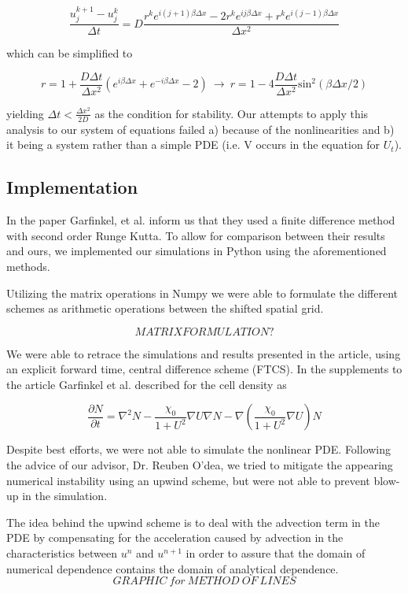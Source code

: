 \documentclass{article}
\begin{document}
$$\frac{u_j^{k+1}-u_j^k}{\Delta t} = D\frac{r^ke^{i(j+1)\beta \Delta x}-2r^ke^{ij\beta \Delta x}+r^ke^{i(j-1)\beta \Delta x}}{\Delta x^2}$$

\medskip
which can be simplified to
\smallskip

$$r=1+\frac{D \Delta t}{\Delta x^2}(e^{i\beta \Delta x}+e^{-i\beta \Delta x}-2)\ \to\ r=1-4\frac{D \Delta t}{\Delta x^2} \mathrm{sin}^2(\beta\Delta x/2)$$
\smallskip

yielding $\Delta t < \frac{\Delta x^2}{2D}$ as the condition for stability. Our attempts to apply this analysis to our system of equations failed a) because of the nonlinearities and b) it being a system rather than a simple PDE (i.e. V occurs in the equation for $U_t$).

\subsection{Implementation}

In the paper Garfinkel, et al. inform us that they used a finite difference method with second order Runge Kutta. To allow for comparison between their results and ours, we implemented our simulations in Python using the aforementioned methods.

Utilizing the matrix operations in Numpy we were able to formulate the different schemes as arithmetic operations between the shifted spatial grid.

$$MATRIX FORMULATION?$$

We were able to retrace the simulations and results presented in the article, using an explicit forward time, central difference scheme (FTCS). In the supplements to the article Garfinkel et al. described for the cell density as

$$\frac{\partial N}{\partial t}=\nabla^2N-\frac{\chi_0}{1+U^2}\nabla U \nabla N- \nabla(\frac{\chi_0}{1+U^2}\nabla U)N$$

Despite best efforts, we were not able to simulate the nonlinear PDE. Following the advice of our advisor, Dr. Reuben O'dea, we tried to mitigate the appearing numerical instability using an upwind scheme, but were not able to prevent blow-up in the simulation.

The idea behind the upwind scheme is to deal with the advection term in the PDE by compensating for the acceleration caused by advection in the characteristics between $u^n$ and $u^{n+1}$ in order to assure that the domain of numerical dependence contains the domain of analytical dependence.
$$GRAPHIC\ for\ METHOD\ OF\ LINES$$
\end{document}
